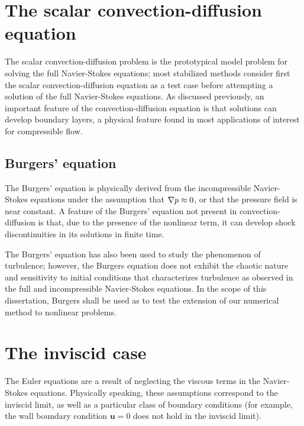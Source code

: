 \section{The scalar convection-diffusion equation}

The scalar convection-diffusion problem is the prototypical model problem for solving the full Navier-Stokes equations; most stabilized methods consider first the scalar convection-diffusion equation as a test case before attempting a solution of the full Navier-Stokes equations. As discussed previously, an important feature of the convection-diffusion equation is that solutions can develop  boundary layers, a physical feature found in most applications of interest for compressible flow. 


\subsection{Burgers' equation}

The Burgers' equation is physically derived from the incompressible Navier-Stokes equations under the assumption that $\grad p \approx 0$, or that the pressure field is near constant. A feature of the Burgers' equation not present in convection-diffusion is that, due to the presence of the nonlinear term, it can develop shock discontinuities in its solutions in finite time. 

The Burgers' equation has also been used to study the phenomenon of turbulence; however, the Burgers equation does not exhibit the chaotic nature and sensitivity to initial conditions that characterizes turbulence as observed in the full and incompressible Navier-Stokes equations. In the scope of this dissertation, Burgers shall be used as to test the extension of our numerical method to nonlinear problems. 

\section{The inviscid case}

The Euler equations are a result of neglecting the viscous terms in the Navier-Stokes equations. Physically speaking, these assumptions correspond to the inviscid limit, as well as a particular class of boundary conditions (for example, the wall boundary condition $\boldsymbol u = 0$ does not hold in the inviscid limit). 

 \cite{BoeingDrela}

